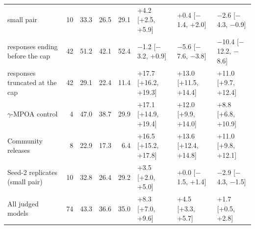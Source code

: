 \begin{table}[t]
\begin{tabular}{@{}lrrrrlll@{}}
\quad small pair & 10 & 33.3 & 26.5 & 29.1 & +4.2 [+2.5, +5.9] & +0.4 [$-$1.4, +2.0] & $-$2.6 [$-$4.3, $-$0.9] \\
\quad responses ending before the cap & 42 & 51.2 & 42.1 & 52.4 & $-$1.2 [$-$3.2, +0.9] & $-$5.6 [$-$7.6, $-$3.8] & $-$10.4 [$-$12.2, $-$8.6] \\
\quad responses truncated at the cap & 42 & 29.1 & 22.4 & 11.4 & +17.7 [+16.2, +19.3] & +13.0 [+11.5, +14.4] & +11.0 [+9.7, +12.4] \\
\midrule
$\gamma$-MPOA control & 4 & 47.0 & 38.7 & 29.9 & +17.1 [+14.9, +19.4] & +12.0 [+9.9, +14.0] & +8.8 [+6.8, +10.9] \\
Community releases & 8 & 22.9 & 17.3 & 6.4 & +16.5 [+15.2, +17.8] & +13.6 [+12.4, +14.8] & +11.0 [+9.8, +12.1] \\
Seed-2 replicates (small pair) & 10 & 32.8 & 26.4 & 29.2 & +3.5 [+2.0, +5.0] & +0.0 [$-$1.5, +1.4] & $-$2.9 [$-$4.3, $-$1.5] \\
\midrule
All judged models & 74 & 43.3 & 36.6 & 35.0 & +8.3 [+7.0, +9.6] & +4.5 [+3.3, +5.7] & +1.7 [+0.5, +2.8] \\
\bottomrule
\end{tabular}
\end{table}

